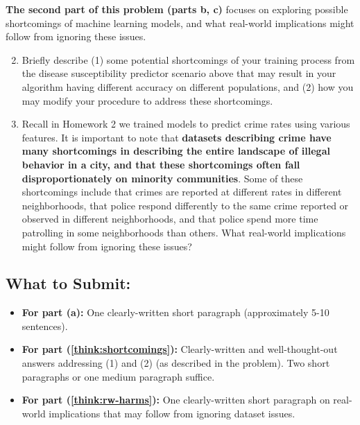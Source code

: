 \documentclass{article}
\begin{document}
\begin{aprob}
\textbf{The second part of this problem (parts b, c)} focuses on exploring possible shortcomings of machine learning models, and what real-world implications might follow from ignoring these issues.

\begin{enumerate}
\setcounter{enumi}{1}
\item {} Briefly describe (1) some potential shortcomings of your training process from the disease susceptibility predictor scenario above that may result in your algorithm having different accuracy on different populations, and (2) how you may modify your procedure to address these shortcomings.\label{think:shortcomings}

\item {} Recall in Homework 2 we trained models to predict crime rates using various features. It is important to note that \textbf{datasets describing crime have many shortcomings in describing the entire landscape of illegal behavior in a city, and that these shortcomings often fall disproportionately on minority communities}. Some of these shortcomings include that crimes are reported at different rates in different neighborhoods, that police respond differently to the same crime reported or observed in different neighborhoods, and that police spend more time patrolling in some neighborhoods than others. What real-world implications might follow from ignoring these issues?\label{think:rw-harms}

\end{enumerate}

\medskip

\subsection*{What to Submit:}
\begin{itemize}
    \item \textbf{For part (a):} One clearly-written short paragraph (approximately 5-10 sentences).
    \item \textbf{For part (\ref{think:shortcomings}):} Clearly-written and well-thought-out answers addressing (1) and (2) (as described in the problem). Two short paragraphs or one medium paragraph suffice. 
    \item \textbf{For part (\ref{think:rw-harms}):} One clearly-written short paragraph on real-world implications that may follow from ignoring dataset issues.
\end{itemize}
\end{aprob}
\end{document}
